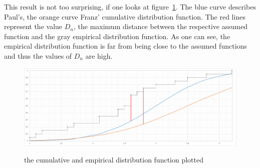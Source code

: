 \documentclass{article}
\begin{document}
This result is not too surprising, if one looks at figure~\ref{fig:1}. The blue curve describes Paul's, the orange curve Franz' cumulative distribution function. The red lines represent the value $D_n$, the maximum distance between the respective assumed function and the gray empirical distribution function.
As one can see, the empirical distribution function is far from being close to the assumed functions and thus the values of $D_n$ are high.
\begin{figure}[here]
\caption{the cumulative and empirical distribution function plotted}
\center
\includegraphics[width=1.0\textwidth]{figures/diagramKSexample.png}
\label{fig:1}
\end{figure}
\end{document}
